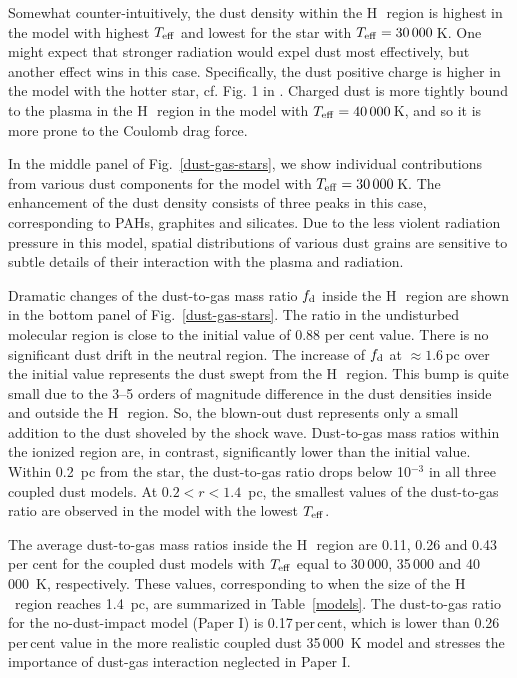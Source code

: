 \documentclass[a4paper,fleqn,usenatbib]{mnras}
\newcommand{\hii}    {H\,{\sc{ii}}~}
\begin{document}
Somewhat counter-intuitively, the dust density within the \hii region is highest in the model with highest $T_{\rm eff}$ and lowest for the star with $T_{\rm eff} =30\,000$\,K. One might expect that stronger radiation would expel dust most effectively, but another effect wins in this case. Specifically, the dust positive charge is higher in the model with the hotter star, cf. Fig. 1 in . Charged dust is more tightly bound to the plasma in the \hii region in the model with $T_{\rm eff} =40\,000$\,K, and so it is more prone to the Coulomb drag force.

In the middle panel of Fig.~\ref{dust-gas-stars}, we show individual contributions from various dust components for the model with $T_{\rm eff}=30\,000$\,K. The enhancement of the dust density consists of three peaks in this case, corresponding to PAHs, graphites and silicates. Due to the less violent radiation pressure in this model, spatial distributions of various dust grains are sensitive to subtle details of their interaction with the plasma and radiation.

Dramatic changes of the dust-to-gas mass ratio $f_{\rm d}$ inside the \hii region are shown in the bottom panel of Fig.~\ref{dust-gas-stars}. The ratio in the undisturbed molecular region is close to the initial value of 0.88 per cent value. There is no significant dust drift in the neutral region. The increase of $f_{\rm d}$ at $\approx1.6\,$pc over the initial value represents the dust swept from the \hii region. This bump is quite small due to the 3--5 orders of magnitude difference in the dust densities inside and outside the \hii region. So, the blown-out dust represents only a small addition to the dust shoveled by the shock wave. Dust-to-gas mass ratios within the ionized region are, in contrast, significantly lower than the initial value. Within 0.2~pc from the star, the dust-to-gas ratio drops below 10$^{-3}$ in all three coupled dust models. At $0.2<r<1.4$~pc, the smallest values of the dust-to-gas ratio are observed in the model with the lowest $T_{\rm eff}$.

The average dust-to-gas mass ratios inside the \hii region are 0.11, 0.26 and 0.43 per cent for the coupled dust models with $T_{\rm eff}$ equal to 30\,000, 35\,000 and 40\,000~K, respectively. These values, corresponding to when the size of the \hii region reaches 1.4~pc, are summarized in Table~\ref{models}. The dust-to-gas ratio for the no-dust-impact model (Paper I) is 0.17\,per\,cent, which is lower than 0.26\,per\,cent value in the more realistic coupled dust 35\,000~K model and stresses the importance of dust-gas interaction neglected in Paper I. 
\end{document}
